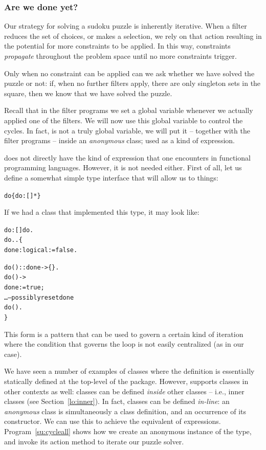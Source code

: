 \subsubsection{Are we done yet?}
Our strategy for solving a sudoku puzzle is inherently iterative. When a filter reduces the set of choices, or makes a selection, we rely on that action resulting in the potential for more constraints to be applied. In this way, constraints \emph{propagate} throughout the problem space until no more constraints trigger.

Only when no constraint can be applied can we ask whether we have solved the puzzle or not: if, when no further filters apply, there are only singleton sets in the square, then we know that we have solved the puzzle.

Recall that in the filter programs we set a global variable whenever we actually applied one of the filters. We will now use this global variable to control the cycles. In fact,  is not a truly global variable, we will put it -- together with the filter programs -- inside an \emph{anonymous} class; used as a kind of  expression.

\go does not directly have the kind of  expression that one encounters in functional programming languages. However, it is not needed either. First of all, let us define a somewhat simple type interface that will allow us to  things:
\begin{alltt}
do \impl \{ do:[]* \}
\end{alltt}
If we had a class that implemented this type, it may look like:
\begin{alltt}
do:[]\sconarrow{}do.
do..\{
  done:logical := false.
  
  do()::done -> \{\}.
  do() ->
    done := true;
    \ldots     -- possibly reset done
    do().
\}
\end{alltt}
This form is a pattern that can be used to govern a certain kind of iteration where the condition that governs the loop is not easily centralized (as in our case).

We have seen a number of examples of \go classes where the definition is essentially statically defined at the top-level of the package. However, \go supports classes in other contexts as well: classes can be defined \emph{inside} other classes -- i.e., inner classes (see Section~\vref{lo:inner}). In fact, classes can be defined \emph{in-line}: an \emph{anonymous} class
is simultaneously a class definition, and an occurrence of its constructor. We can use this to achieve the equivalent of  expressions. Program~\vref{su:cycleall} shows how we create an anonymous instance of the  type, and invoke its  action method to iterate our puzzle solver.

